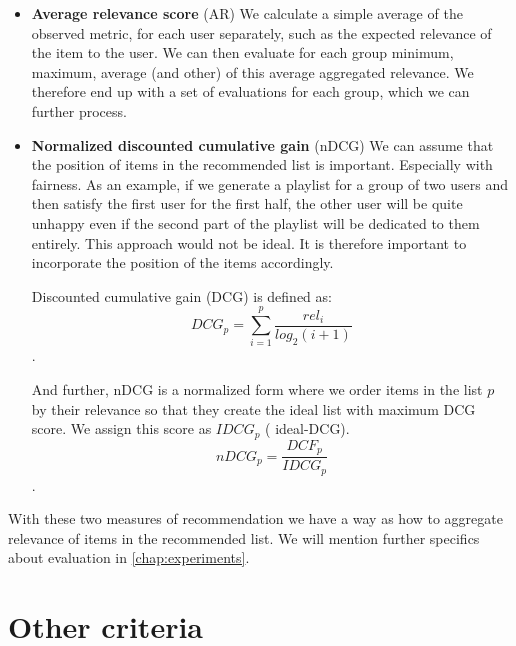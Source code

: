 \begin{itemize}
    \item \textbf{Average relevance score} (AR)
        We calculate a simple average of the observed metric, for each user separately, such as the expected relevance of the item to the user. We can then evaluate for each group minimum, maximum, average (and other) of this average aggregated relevance. We therefore end up with a set of evaluations for each group, which we can further process.
    
    \item \textbf{Normalized discounted cumulative gain} (nDCG)
        We can assume that the position of items in the recommended list is important. Especially with fairness. As an example, if we generate a playlist for a group of two users and then satisfy the first user for the first half, the other user will be quite unhappy even if the second part of the playlist will be dedicated to them entirely. This approach would not be ideal. It is therefore important to incorporate the position of the items accordingly.
        
        Discounted cumulative gain (DCG) is defined as:
        \begin{equation}
            DCG_p = \sum_{i=1}^p \dfrac{rel_i}{log_2(i+1)}
        \end{equation}.
        
        And further, nDCG is a normalized form where we order items in the list $p$ by their relevance so that they create the ideal list with maximum DCG score. We assign this score as $IDCG_p$ ( ideal-DCG).
        \begin{equation}
            nDCG_p = \dfrac{DCF_p}{IDCG_p}
        \end{equation}.
\end{itemize}

With these two measures of recommendation we have a way as how to aggregate relevance of items in the recommended list. We will mention further specifics about evaluation in \ref{chap:experiments}.




\section{Other criteria} \label{sec:02_other_criteria}

